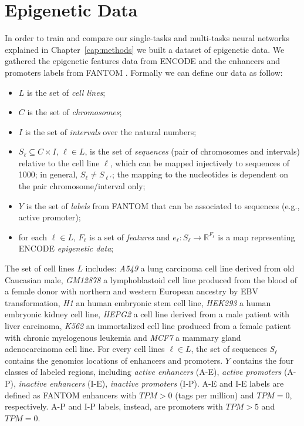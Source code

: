 \section{Epigenetic Data}
In order to train and compare our single-tasks and multi-tasks neural networks explained in Chapter~\ref{cap:methods} we built a dataset of epigenetic data. We gathered the epigenetic features data from
ENCODE \cite{ENCODE_data} and the enhancers and promoters labels from
FANTOM \cite{FANTOM_data}. Formally we can define our data as follow: 
\begin{itemize}
    \item $L$ is the set of \emph{cell lines};
    \item $C$ is the set of \emph{chromosomes};
    \item $I$ is the set of \emph{intervals} over the natural numbers;
    \item $S_\ell\subseteq C\times I$, $\ell\in L$, is the set of \emph{sequences} (pair of chromosomes and intervals) relative to the cell line $\ell$, which can be mapped injectively to sequences of 1000; in general, $S_\ell\neq S_{\ell'}$; the mapping to the nucleotides is dependent on the pair chromosome/interval only;
    \item $Y$ is the set of \emph{labels} from FANTOM that can be associated to sequences (e.g., active promoter);
    \item for each $\ell\in L$, $F_\ell$ is a set of \emph{features} and $e_\ell:S_\ell\to\mathbb R^{F_\ell}$ is a map representing ENCODE \emph{epigenetic data};
\end{itemize}
The set of cell lines $L$ includes: \emph{A549} a lung carcinoma cell line derived from old Caucasian male, \emph{GM12878} a lymphoblastoid cell line produced from the blood of a female donor with northern and western European ancestry by EBV transformation, \emph{H1} an human embryonic stem cell line, \emph{HEK293} a human embryonic kidney cell line, \emph{HEPG2} a cell line derived from a male patient with liver carcinoma, \emph{K562} an immortalized cell line produced from a female patient with chronic myelogenous leukemia and \emph{MCF7} a mammary gland adenocarcinoma cell line. For every cell lines $\ell \in L$, the set of sequences $S_\ell$ contains the genomics locations of enhancers and promoters. $Y$ contains the four classes of labeled regions, including \emph{active enhancers} (A-E), \emph{active promoters} (A-P), \emph{inactive enhancers} (I-E), \emph{inactive promoters} (I-P). A-E and I-E labels are defined as FANTOM enhancers with $TPM>0$ (tags per million) and $TPM=0$, respectively. A-P and I-P labels, instead, are promoters with $TPM>5$ and $TPM=0$. 

